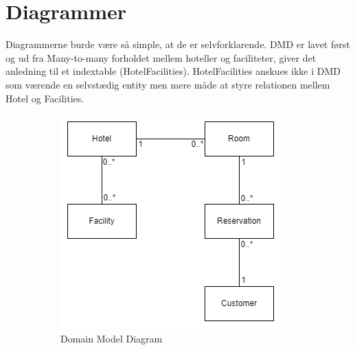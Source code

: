 \section*{Diagrammer}
Diagrammerne burde være så simple, at de er selvforklarende. DMD er lavet først og ud fra Many-to-many forholdet mellem hoteller og faciliteter, giver det anledning til et indextable (HotelFacilities).
HotelFacilities anskues ikke i DMD som værende en selvstædig entity men mere måde at styre relationen mellem Hotel og Facilities.

\begin{figure}
    \centering
    \begin{subfigure}[b]{0.45\textwidth}
        \centering
        \includegraphics[width=\textwidth]{figures/SWD_Domain_HotelManagement.png}
        \caption{Domain Model Diagram}\label{DomainModelDiagram}
    \end{subfigure}
    \hfill
    \begin{subfigure}[b]{0.45\textwidth}
        \centering

\end{subfigure}
\end{figure}
